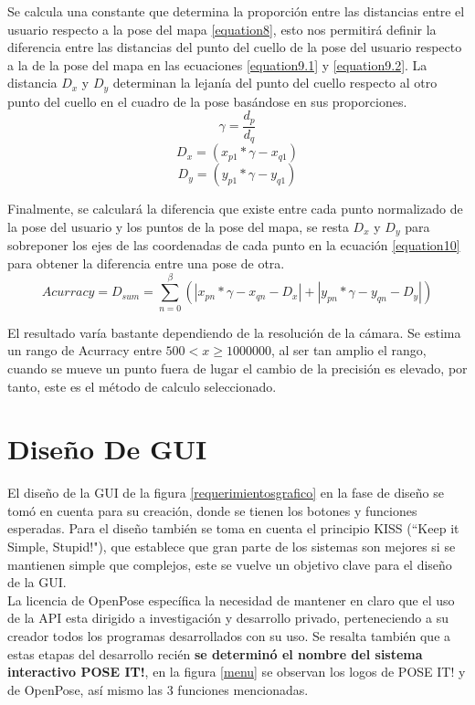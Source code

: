 Se calcula una constante que determina la proporción entre las distancias entre el usuario respecto a la pose del mapa \ref{equation8}, esto nos permitirá definir la diferencia entre las distancias del punto del cuello de la pose del usuario respecto a la de la pose del mapa en las ecuaciones \ref{equation9.1} y \ref{equation9.2}. La distancia $D_x$ y $D_y$ determinan la lejanía del punto del cuello respecto al otro punto del cuello en el cuadro de la pose basándose en sus proporciones.
\begin{equation}
\gamma = \frac{d_p}{d_q}
\label{equation8}
\end{equation}
\begin{equation}
D_x= (x_{p1}*\gamma - x_{q1})
\label{equation9.1}
\end{equation}
\begin{equation}
D_y= (y_{p1}*\gamma - y_{q1})
\label{equation9.2}
\end{equation}

Finalmente, se calculará la diferencia que existe entre cada punto normalizado de la pose del usuario y los puntos de la pose del mapa, se resta $D_x$ y $D_y$ para sobreponer los ejes de las coordenadas de cada punto en la ecuación \ref{equation10} para obtener la diferencia entre una pose de otra. 
\begin{equation}
Acurracy = D_{sum} = \sum_{n=0}^\beta (\left | x_{pn}*\gamma -x_{qn}-D_x \right |+\left | y_{pn}*\gamma -y_{qn}-D_y \right |) 
\label{equation10}
\end{equation}

El resultado varía bastante dependiendo de la resolución de la cámara. Se estima un rango de Acurracy entre $ 500 < x \geq 1000000$, al ser tan amplio el rango, cuando se mueve un punto fuera de lugar el cambio de la precisión es elevado, por tanto, este es el método de calculo seleccionado.



\section{Diseño De GUI}

El diseño de la GUI de la figura \ref{requerimientosgrafico} en la fase de diseño se tomó en cuenta para su creación, donde se tienen los botones y funciones esperadas. Para el diseño también se toma en cuenta el principio KISS (``Keep it Simple, Stupid!"), que establece que gran parte de los sistemas son mejores si se mantienen simple que complejos, este se vuelve un objetivo clave para el diseño de la GUI.
\\
La licencia de OpenPose específica la necesidad de mantener en claro que el uso de la API esta dirigido a investigación y desarrollo privado, perteneciendo a su creador todos los programas desarrollados con su uso.
Se resalta también que a estas etapas del desarrollo recién \textbf{se determinó el nombre del sistema interactivo POSE IT!}, en la figura \ref{menu} se observan los logos de POSE IT! y de OpenPose, así mismo las 3 funciones mencionadas.

